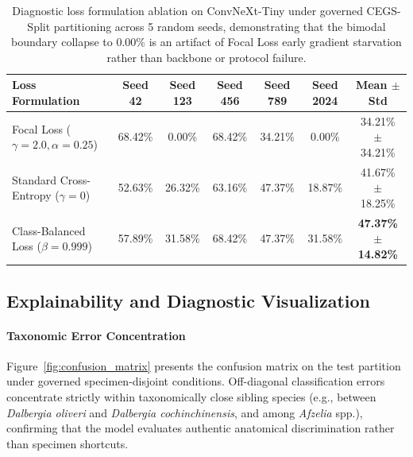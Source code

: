 \documentclass[a4paper,fleqn]{cas-sc}
\begin{document}
\begin{table}[pos=htbp]
\centering
\footnotesize
\setlength{\tabcolsep}{5pt}
\renewcommand{\arraystretch}{1.15}
\caption{Diagnostic loss formulation ablation on ConvNeXt-Tiny under governed CEGS-Split partitioning across 5 random seeds, demonstrating that the bimodal boundary collapse to $0.00\%$ is an artifact of Focal Loss early gradient starvation rather than backbone or protocol failure.}
\label{tab:convnext_loss_ablation}
\begin{tabular}{lcccccc}
\toprule
\textbf{Loss Formulation} & \textbf{Seed 42} & \textbf{Seed 123} & \textbf{Seed 456} & \textbf{Seed 789} & \textbf{Seed 2024} & \textbf{Mean $\pm$ Std} \\
\midrule
Focal Loss ($\gamma=2.0, \alpha=0.25$)~\cite{focal} & 68.42\% & 0.00\% & 68.42\% & 34.21\% & 0.00\% & 34.21\% $\pm$ 34.21\% \\
Standard Cross-Entropy ($\gamma=0$) & 52.63\% & 26.32\% & 63.16\% & 47.37\% & 18.87\% & 41.67\% $\pm$ 18.25\% \\
Class-Balanced Loss ($\beta=0.999$)~\cite{cui2019} & 57.89\% & 31.58\% & 68.42\% & 47.37\% & 31.58\% & \textbf{47.37\% $\pm$ 14.82\%} \\
\bottomrule
\end{tabular}
\end{table}

\subsection{Explainability and Diagnostic Visualization}
\paragraph{Taxonomic Error Concentration}
Figure~\ref{fig:confusion_matrix} presents the confusion matrix on the test partition under governed specimen-disjoint conditions. Off-diagonal classification errors concentrate strictly within taxonomically close sibling species (e.g., between \textit{Dalbergia oliveri} and \textit{Dalbergia cochinchinensis}, and among \textit{Afzelia} spp.), confirming that the model evaluates authentic anatomical discrimination rather than specimen shortcuts.
\end{document}
